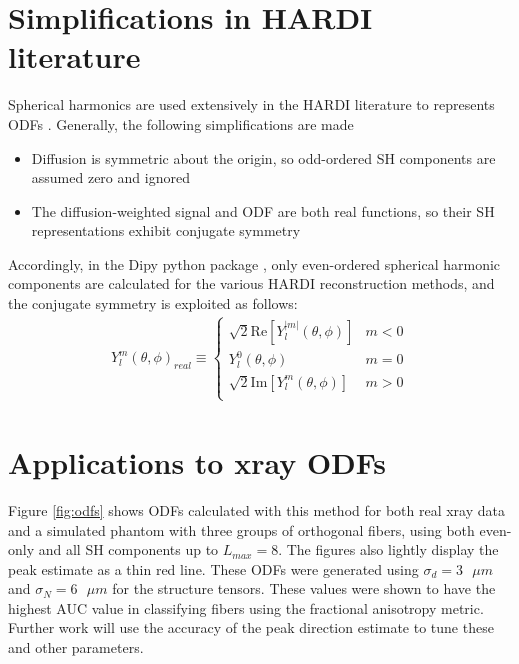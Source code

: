 \documentclass[11pt]{article}
\begin{document}
\section{Simplifications in HARDI literature}

Spherical harmonics are used extensively in the HARDI literature
to represents ODFs \cite{Tournier2004}. Generally, the following simplifications are made

\begin{itemize}
\item Diffusion is symmetric about the origin, so odd-ordered SH components are assumed zero and ignored
\item The diffusion-weighted signal and ODF are both real functions, so their SH representations exhibit conjugate symmetry
\end{itemize}

Accordingly, in the Dipy python package \cite{Garyfallidis2014}, only even-ordered spherical harmonic
components are calculated for the various HARDI reconstruction methods, and the
conjugate symmetry is exploited as follows:
\begin{align}
  Y_{l}^m(\theta, \phi)_{real} \equiv
  \begin{cases}
    \sqrt{2}\text{Re}\left[Y_l^{|m|}(\theta, \phi)\right] & m < 0\\
    Y_l^0(\theta, \phi) & m = 0\\
    \sqrt{2}\text{Im}\left[Y_l^m(\theta, \phi)\right] & m > 0\\
  \end{cases}
  \label{eq:real_Y}
\end{align}

\section{Applications to xray ODFs}

Figure \ref{fig:odfs} shows ODFs calculated with this method for both real xray data
and a simulated phantom with three groups of orthogonal fibers, using both even-only and
all SH components up to $L_{max} = 8$. The figures also lightly display the peak
estimate as a thin red line. These ODFs were generated using
$\sigma_d = 3 \text{ } \mu m$ and $\sigma_N = 6 \text{ } \mu m$ for the structure tensors. These
values were shown to have the highest AUC value in classifying fibers using the
fractional anisotropy metric. Further work will use the accuracy of the peak direction
estimate to tune these and other parameters.
\end{document}
